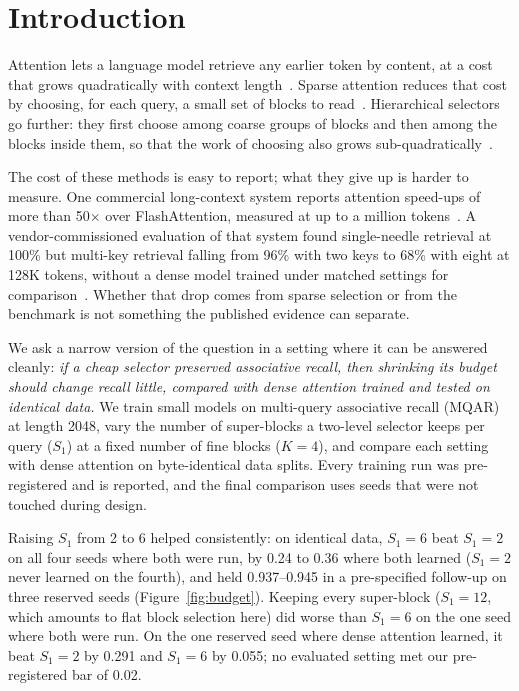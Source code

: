 \section{Introduction}
\label{sec:intro}

Attention lets a language model retrieve any earlier token by content, at a cost that grows quadratically with
context length~\cite{vaswani2017attention}. Sparse attention reduces that cost by choosing, for each query, a small
set of blocks to read~\cite{child2019sparse,roy2021routing,yuan2025nsa}. Hierarchical selectors go further: they
first choose among coarse groups of blocks and then among the blocks inside them, so that the work of choosing also
grows sub-quadratically~\cite{roy2021routing,lee2025hip,xu2026hisa,mao2026gist,hu2026hils}.

The cost of these methods is easy to report; what they give up is harder to measure. One commercial long-context
system reports attention speed-ups of more than 50$\times$ over FlashAttention, measured at up to a million
tokens~\cite{subq2026,appen2026}. A vendor-commissioned evaluation of that system found single-needle retrieval at
100\% but multi-key retrieval falling from 96\% with two keys to 68\% with eight at 128K tokens, without a dense
model trained under matched settings for comparison~\cite{appen2026}. Whether that drop comes from sparse selection or
from the benchmark is not something the published evidence can separate.

We ask a narrow version of the question in a setting where it can be answered cleanly: \emph{if a cheap selector
preserved associative recall, then shrinking its budget should change recall little, compared with dense attention
trained and tested on identical data.} We train small models on multi-query associative recall
(MQAR)~\cite{arora2024zoology} at length 2048, vary the number of super-blocks a two-level selector keeps per query
($S_1$) at a fixed number of fine blocks ($K{=}4$), and compare each setting with dense attention on byte-identical
data splits. Every training run was pre-registered and is reported, and the final comparison uses seeds that were not
touched during design.

Raising $S_1$ from 2 to 6 helped consistently: on identical data, $S_1{=}6$ beat $S_1{=}2$ on all four seeds where
both were run, by 0.24 to 0.36 where both learned ($S_1{=}2$ never learned on the fourth), and held 0.937--0.945 in a pre-specified follow-up on three reserved seeds (Figure~\ref{fig:budget}). Keeping
every super-block ($S_1{=}12$, which amounts to flat block selection here) did worse than $S_1{=}6$ on the one seed
where both were run. On the one reserved seed where dense attention learned, it beat $S_1{=}2$ by 0.291 and $S_1{=}6$ by
0.055; no evaluated setting met our pre-registered bar of 0.02.

